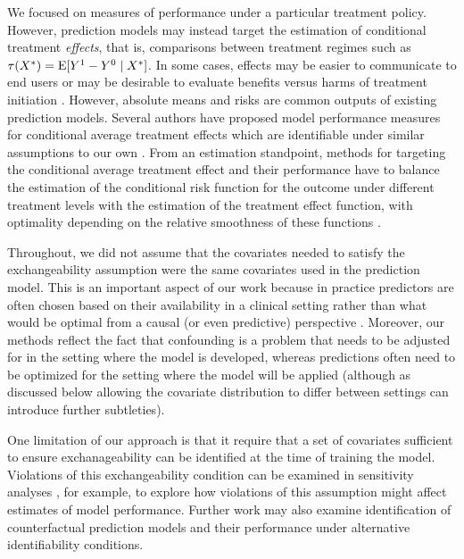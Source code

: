 We focused on measures of performance under a particular treatment policy. However, prediction models may instead target the estimation of conditional treatment \textit{effects}, that is, comparisons between treatment regimes such as $\tau(X^*) = \operatorname{E}[Y^1 - Y^0 \mid X^*]$. In some cases, effects may be easier to communicate to end users or may be desirable to evaluate benefits versus harms of treatment initiation \cite{kent_predictive_2020}. However, absolute means and risks are common outputs of existing prediction models. Several authors have proposed model performance measures for conditional average treatment effects which are identifiable under similar assumptions to our own \cite{schuler_comparison_2018, rolling2014model, xu_calibration_2022, van2003unified, alaa_validating_2019}. From an estimation standpoint, methods for targeting the conditional average treatment effect and their performance have to balance the estimation of the conditional risk function for the outcome under different treatment levels with the estimation of the treatment effect function, with optimality depending on the relative smoothness of these functions \cite{kennedy_towards_2022}.

Throughout, we did not assume that the covariates needed to satisfy the exchangeability assumption were the same covariates used in the prediction model. This is an important aspect of our work because in practice predictors are often chosen based on their availability in a clinical setting rather than what would be optimal from a causal (or even predictive) perspective \cite{steyerberg_clinical_2019, coston_counterfactual_2021}. Moreover, our methods reflect the fact that confounding is a problem that needs to be adjusted for in the setting where the model is developed, whereas predictions often need to be optimized for the setting where the model will be applied (although as discussed below allowing the covariate distribution to differ between settings can introduce further subtleties).

One limitation of our approach is that it require that a set of covariates sufficient to ensure exchanageability can be identified at the time of training the model. Violations of this exchangeability condition can be examined in sensitivity analyses \cite{robins_sensitivity_2000,steingrimsson_sensitivity_2023}, for example, to explore how violations of this assumption might affect estimates of model performance. Further work may also examine identification of counterfactual prediction models and their performance under alternative identifiability conditions.

